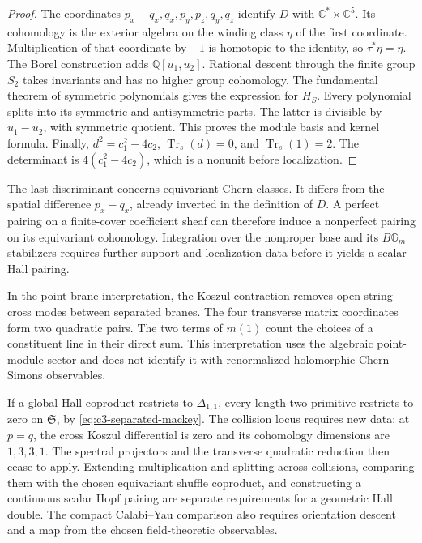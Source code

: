 \begin{proof}
The coordinates $p_x-q_x,q_x,p_y,p_z,q_y,q_z$ identify $D$ with
$\mathbb C^*\times\mathbb C^5$. Its cohomology is the exterior
algebra on the winding class $\eta$ of the first coordinate.
Multiplication of that coordinate by $-1$ is homotopic to the
identity, so $\tau^*\eta=\eta$.
The Borel construction adds $\mathbb Q[u_1,u_2]$.
Rational descent through the finite group $S_2$ takes invariants
and has no higher group cohomology. The fundamental theorem of
symmetric polynomials gives the expression for $H_S$.
Every polynomial splits into its symmetric and antisymmetric
parts. The latter is divisible by $u_1-u_2$, with symmetric quotient.
This proves the module basis and kernel formula. Finally,
$d^2=c_1^2-4c_2$, $\operatorname{Tr}_s(d)=0$, and
$\operatorname{Tr}_s(1)=2$. The determinant is
$4(c_1^2-4c_2)$, which is a nonunit before localization.
\end{proof}

The last discriminant concerns equivariant Chern classes.
It differs from the spatial difference $p_x-q_x$, already inverted
in the definition of $D$. A perfect pairing on a finite-cover
coefficient sheaf can therefore induce a nonperfect pairing on
its equivariant cohomology. Integration over the nonproper base
and its $B\mathbb G_m$ stabilizers requires further support and
localization data before it yields a scalar Hall pairing.

In the point-brane interpretation, the Koszul contraction removes
open-string cross modes between separated branes. The four transverse
matrix coordinates form two quadratic pairs. The two terms of
$m(1)$ count the choices of a constituent line in their direct sum.
This interpretation uses the algebraic point-module sector and
does not identify it with renormalized holomorphic Chern--Simons observables.

If a global Hall coproduct restricts to $\Delta_{1,1}$, every
length-two primitive restricts to zero on $\mathfrak S$, by
\eqref{eq:c3-separated-mackey}. The collision locus requires new
data: at $p=q$, the cross Koszul differential is zero and its
cohomology dimensions are $1,3,3,1$.
The spectral projectors and the transverse quadratic reduction
then cease to apply. Extending multiplication and splitting across
collisions, comparing them with the chosen equivariant shuffle
coproduct, and constructing a continuous scalar Hopf pairing are
separate requirements for a geometric Hall double. The compact
Calabi--Yau comparison also requires orientation descent and a
map from the chosen field-theoretic observables.
